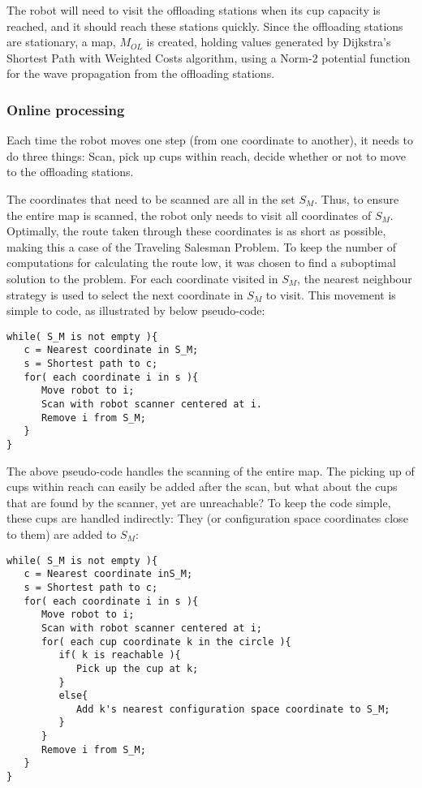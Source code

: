 The robot will need to visit the offloading stations when its cup capacity is reached, and it should
reach these stations quickly. Since the offloading stations are stationary, a map, \(M_{OL}\) is created,
holding values generated by Dijkstra's Shortest Path with Weighted Costs algorithm, using a Norm-2 potential function
for the wave propagation from the offloading stations.

\subsubsection{Online processing}

Each time the robot moves one step (from one coordinate to another),
it needs to do three things: Scan, pick up cups within reach, decide whether or not to move to the offloading stations.

The coordinates that need to be scanned are all in the set \(S_{M}\).
Thus, to ensure the entire map is scanned, the robot only needs to visit all coordinates of  \(S_{M}\).
Optimally, the route taken through these coordinates is as short as possible,
making this a case of the Traveling Salesman Problem.
To keep the number of computations for calculating the route low, it was chosen to find a suboptimal solution to the problem.
For each coordinate visited in \(S_{M}\), the nearest neighbour strategy is used to select the next coordinate in \(S_{M}\) to visit.
This movement is simple to code, as illustrated by below pseudo-code:

\begin{verbatim}
while( S_M is not empty ){
   c = Nearest coordinate in S_M;
   s = Shortest path to c;
   for( each coordinate i in s ){
      Move robot to i;
      Scan with robot scanner centered at i.
      Remove i from S_M;
   }
}
\end{verbatim}

The above pseudo-code handles the scanning of the entire map.
The picking up of cups within reach can easily be added after the scan,
but what about the cups that are found by the scanner, yet are unreachable?
To keep the code simple, these cups are handled indirectly: They (or configuration space coordinates close to them) are added to \(S_{M}\):

\begin{verbatim}
while( S_M is not empty ){
   c = Nearest coordinate inS_M;
   s = Shortest path to c;
   for( each coordinate i in s ){
      Move robot to i;
      Scan with robot scanner centered at i;
      for( each cup coordinate k in the circle ){
         if( k is reachable ){
            Pick up the cup at k;
         }
         else{
            Add k's nearest configuration space coordinate to S_M;
         }
      }
      Remove i from S_M;
   }
}
\end{verbatim}

